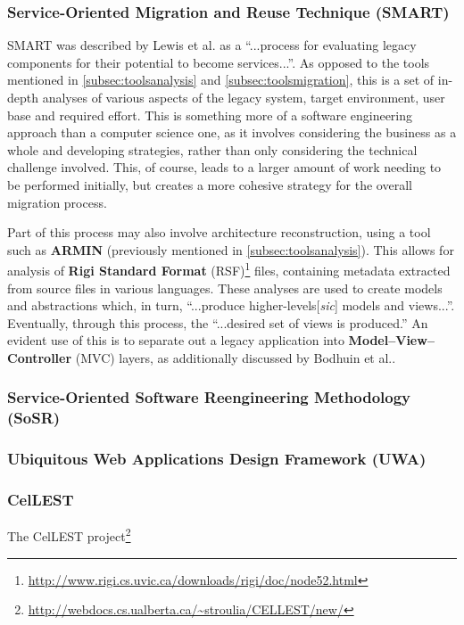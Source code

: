 \documentclass[12pt,journal,compsoc]{IEEEtran}
\begin{document}
\subsubsection{Service-Oriented Migration and Reuse Technique (SMART)}
\label{subsubsec:smart}
SMART was described by Lewis et al. as a ``...process for evaluating legacy components for their potential to become services...''\cite{Lewis2005,Lewis2005a}. As opposed to the tools mentioned in \autoref{subsec:toolsanalysis} and \autoref{subsec:toolsmigration}, this is a set of in-depth analyses of various aspects of the legacy system, target environment, user base and required effort. This is something more of a software engineering approach than a computer science one, as it involves considering the business as a whole and developing strategies, rather than only considering the technical challenge involved. This, of course, leads to a larger amount of work needing to be performed initially, but creates a more cohesive strategy for the overall migration process.

Part of this process may also involve architecture reconstruction, using a tool such as \textbf{ARMIN} (previously mentioned in \autoref{subsec:toolsanalysis}). This allows for analysis of \textbf{Rigi Standard Format} (RSF)\footnote{\url{http://www.rigi.cs.uvic.ca/downloads/rigi/doc/node52.html}} files, containing metadata extracted from source files in various languages\cite{O'Brien2005}. These analyses are used to create models and abstractions which, in turn, ``...produce higher-levels[\textit{sic}] models and views...''\cite{O'Brien2005}. Eventually, through this process, the ``...desired set of views is produced.''\cite{O'Brien2005} An evident use of this is to separate out a legacy application into \textbf{Model--View--Controller} (MVC) layers, as additionally discussed by Bodhuin et al.\cite{Bodhuin2002}.

\subsubsection{Service-Oriented Software Reengineering Methodology (SoSR)}
\label{subsubsec:sosr}

\subsubsection{Ubiquitous Web Applications Design Framework (UWA)}
\label{subsubsec:uwa}

\subsubsection{CelLEST}
\label{subsubsec:cellest}
The CelLEST project\footnote{\url{http://webdocs.cs.ualberta.ca/~stroulia/CELLEST/new/}}
\end{document}
